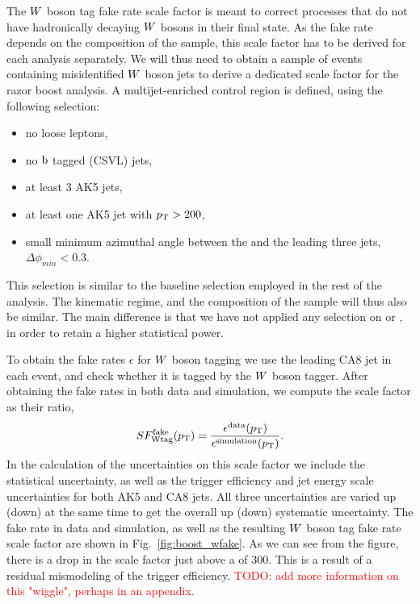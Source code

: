 The $W$ boson tag fake rate scale factor is meant to correct processes that do not have
hadronically decaying $W$ bosons in their final state. As the fake rate depends on the composition
of the sample, this scale factor has to be derived for each analysis separately. 
We will thus need to obtain a sample of events containing misidentified $W$ boson jets to derive a
dedicated scale factor for the razor boost analysis. A multijet-enriched control region is defined,
using the following selection:
\begin{itemize}
\item no loose leptons, 
\item no $\mathrm{b}$ tagged (CSVL) jets,
\item at least 3 AK5 jets,
\item at least one AK5 jet with $p_{\mathrm{T}}>200$\GeV,
\item small minimum azimuthal angle between the \VEtmiss and the leading three jets, \\
$\Delta\phi_{min} < 0.3$.
\end{itemize}
This selection is similar to the baseline selection employed in the rest of the analysis. The
kinematic regime, and the composition of the sample will thus also be similar. The main difference
is that we have not applied any selection on \mr or \rsq, in order to retain a higher statistical
power. 

To obtain the fake rates $\epsilon$ for $W$ boson tagging we use the leading CA8 jet in each
event, and check whether it is tagged by the $W$ boson tagger. After obtaining the
fake rates in both data and simulation, we compute the scale factor as their ratio,
\begin{equation}
SF_\textrm{Wtag}^\textrm{fake}(p_{\mathrm{T}}) =
\frac{\epsilon^{\textrm{data}}(p_{\mathrm{T}})}{\epsilon^{\textrm{simulation}}(p_{\mathrm{T}})}.
\end{equation} 
In the calculation of the uncertainties on this scale factor we include the statistical uncertainty,
as well as the trigger efficiency and jet energy scale uncertainties for both AK5 and CA8 jets. 
All three uncertainties are varied up (down) at the same time to get the overall up (down)
systematic  uncertainty.
The fake rate in data and simulation, as well as the resulting $W$ boson tag fake rate scale factor
are shown in Fig.~\ref{fig:boost_wfake}. As we can see from the figure, there is a drop in the scale
factor just above a \pt of 300\GeV. This is a result of a residual mismodeling of the trigger
efficiency. 
\textcolor{red}{TODO: add more information on this "wiggle", perhaps in an appendix.}

